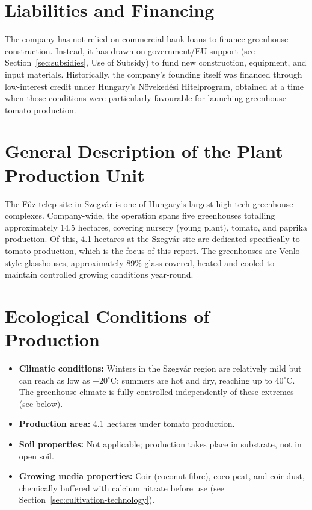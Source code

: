 \section{Liabilities and Financing}
The company has not relied on commercial bank loans to finance greenhouse construction. Instead, it has drawn on government/EU support (see Section~\ref{sec:subsidies}, Use of Subsidy) to fund new construction, equipment, and input materials. Historically, the company's founding itself was financed through low-interest credit under Hungary's Növekedési Hitelprogram, obtained at a time when those conditions were particularly favourable for launching greenhouse tomato production.

\section{General Description of the Plant Production Unit}
The Fűz-telep site in Szegvár is one of Hungary's largest high-tech greenhouse complexes. Company-wide, the operation spans five greenhouses totalling approximately 14.5 hectares, covering nursery (young plant), tomato, and paprika production. Of this, 4.1 hectares at the Szegvár site are dedicated specifically to tomato production, which is the focus of this report. The greenhouses are Venlo-style glasshouses, approximately 89\% glass-covered, heated and cooled to maintain controlled growing conditions year-round.

\section{Ecological Conditions of Production}
\label{sec:ecological-conditions}
\begin{itemize}
    \item \textbf{Climatic conditions:} Winters in the Szegvár region are relatively mild but can reach as low as $-20^{\circ}\mathrm{C}$; summers are hot and dry, reaching up to $40^{\circ}\mathrm{C}$. The greenhouse climate is fully controlled independently of these extremes (see below).
    \item \textbf{Production area:} 4.1 hectares under tomato production.
    \item \textbf{Soil properties:} Not applicable; production takes place in substrate, not in open soil.
    \item \textbf{Growing media properties:} Coir (coconut fibre), coco peat, and coir dust, chemically buffered with calcium nitrate before use (see Section~\ref{sec:cultivation-technology}).
\end{itemize}

